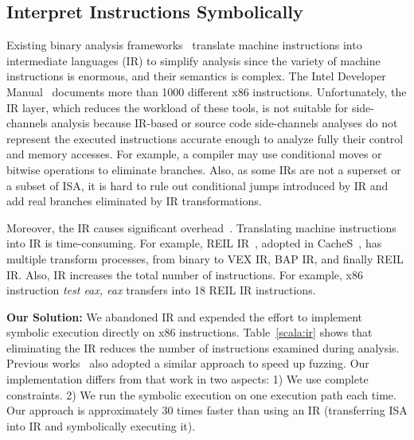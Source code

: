 \subsection{Interpret Instructions Symbolically}
Existing binary analysis frameworks~\cite{shoshitaishvili2016state,
10.1007/978-3-642-22110-1_37, song2008bitblaze} translate machine instructions into
intermediate languages (IR) to simplify analysis since
the variety of machine instructions is
enormous, and their semantics is complex. The Intel Developer
Manual~\cite{intelsys} documents more than 1000 different x86 instructions. 
Unfortunately, the IR layer, which
reduces the workload of these tools, is not suitable for side-channels 
analysis because
IR-based or source code side-channels analyses do not represent the executed instructions accurate enough to analyze fully their control and memory accesses.
For example, a compiler may use conditional moves or bitwise operations to eliminate
branches. Also, as some IRs are not a superset or a subset of ISA, 
it is hard to rule out conditional jumps introduced by IR and add real branches 
eliminated by IR transformations.

Moreover, the IR causes significant overhead~\cite{217563}.
Translating machine instructions into IR is time-consuming. For example,
REIL IR~\cite{dullien2009reil}, adopted in CacheS~\cite{236338}, has multiple
transform processes, from binary to VEX IR, BAP IR, and finally REIL IR\@. 
Also, IR increases the total number of instructions. For example, x86
instruction \textit{test eax, eax} transfers into 18 REIL IR instructions.

\textbf{Our Solution:}
We abandoned IR and expended the effort to implement 
symbolic execution directly on x86 instructions. 
Table~\ref{scala:ir} shows that eliminating the IR reduces the number 
of instructions examined during analysis. Previous works~\cite{217563} also 
adopted a similar approach to speed up fuzzing. Our implementation differs
from that work in two aspects: 1) We use complete constraints. 2) We run the
symbolic execution on one execution path each time. Our approach is approximately 30 times faster than using an IR (transferring ISA into IR and
symbolically executing it).

